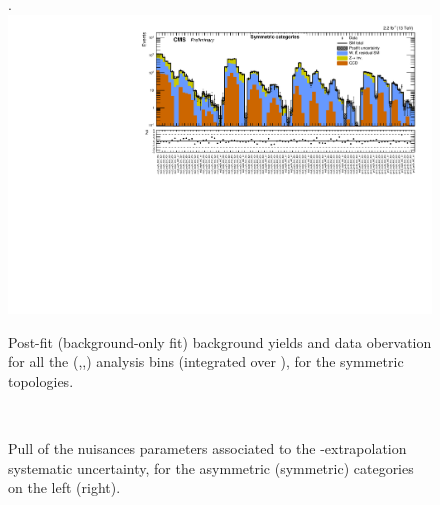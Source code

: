 \clearpage
\begin{landscape}
  \begin{center}
    \begin{figure}[h!]
      \caption{Post-fit (background-only fit) background yields and data obervation for all the (\njet,\nb,\scalht) analysis bins (integrated over \MHT), for the symmetric topologies. \label{fig:summaryPlot_fit_b_Symmetric}}.
      \includegraphics[width=0.8\linewidth]{figures/postFitResults/summaryPlots/summaryPlot_fit_b_Symmetric}
    \end{figure}
  \end{center}
\end{landscape}




\clearpage
\begin{figure}[tbhp]
    \caption{ Pull of the nuisances parameters associated to the \alt-extrapolation systematic uncertainty, 
      for the asymmetric (symmetric) categories on the left (right).
      \label{fig:nuisPull_AlphaT}}
  \begin{center}
     ~~
  \end{center}
\end{figure}

